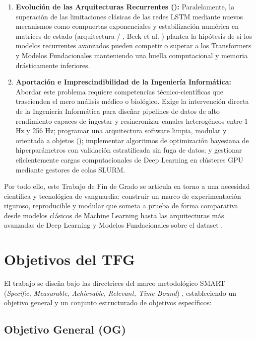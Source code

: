 \begin{enumerate}[label=\bfseries M\arabic*.]
    \item \textbf{Evolución de las Arquitecturas Recurrentes (\xlstm{}):} Paralelamente, la superación de las limitaciones clásicas de las redes LSTM mediante nuevos mecanismos como compuertas exponenciales y estabilización numérica en matrices de estado (arquitectura \xlstm{} / \slstm{}, Beck et al. \cite{beck2024xlstm}) plantea la hipótesis de si los modelos recurrentes avanzados pueden competir o superar a los Transformers y Modelos Fundacionales manteniendo una huella computacional y memoria drásticamente inferiores.
    \item \textbf{Aportación e Imprescindibilidad de la Ingeniería Informática:} Abordar este problema requiere competencias técnico-científicas que trascienden el mero análisis médico o biológico. Exige la intervención directa de la Ingeniería Informática para diseñar pipelines de datos de alto rendimiento capaces de ingestar y resincronizar canales heterogéneos entre 1 Hz y 256 Hz; programar una arquitectura software limpia, modular y orientada a objetos (); implementar algoritmos de optimización bayesiana de hiperparámetros con validación estratificada sin fuga de datos; y gestionar eficientemente cargas computacionales de Deep Learning en clústeres GPU mediante gestores de colas SLURM.
\end{enumerate}

Por todo ello, este Trabajo de Fin de Grado se articula en torno a una necesidad científica y tecnológica de vanguardia: construir un marco de experimentación riguroso, reproducible y modular que someta a prueba de forma comparativa desde modelos clásicos de Machine Learning hasta las arquitecturas más avanzadas de Deep Learning y Modelos Fundacionales sobre el dataset \fatigueset{}.

\section{Objetivos del TFG}
\label{sec:intro_objetivos}

El trabajo se diseña bajo las directrices del marco metodológico SMART (\textit{Specific, Measurable, Achievable, Relevant, Time-Bound}) \cite{guillen2025libro}, estableciendo un objetivo general y un conjunto estructurado de objetivos específicos:

\subsection{Objetivo General (OG)}

